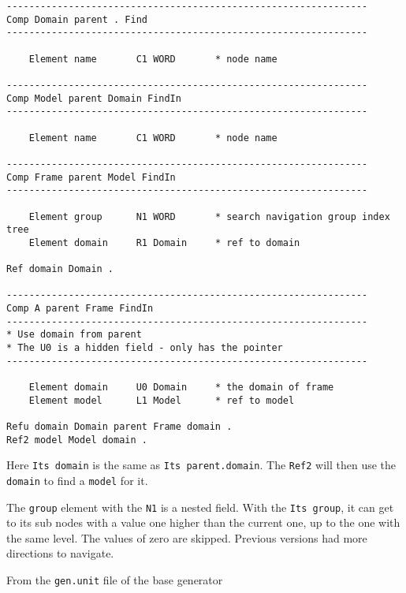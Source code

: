 \begin{verbatim}
----------------------------------------------------------------
Comp Domain parent . Find
----------------------------------------------------------------

    Element name       C1 WORD       * node name

----------------------------------------------------------------
Comp Model parent Domain FindIn
----------------------------------------------------------------

    Element name       C1 WORD       * node name

----------------------------------------------------------------
Comp Frame parent Model FindIn
----------------------------------------------------------------

    Element group      N1 WORD       * search navigation group index tree
    Element domain     R1 Domain     * ref to domain

Ref domain Domain .

----------------------------------------------------------------
Comp A parent Frame FindIn
----------------------------------------------------------------
* Use domain from parent
* The U0 is a hidden field - only has the pointer
----------------------------------------------------------------

    Element domain     U0 Domain     * the domain of frame
    Element model      L1 Model      * ref to model

Refu domain Domain parent Frame domain .
Ref2 model Model domain .
\end{verbatim}

Here \texttt{Its\ domain} is the same as \texttt{Its\ parent.domain}.
The \texttt{Ref2} will then use the \texttt{domain} to find a
\texttt{model} for it.

The \texttt{group} element with the \texttt{N1} is a nested field. With
the \texttt{Its\ group}, it can get to its sub nodes with a value one
higher than the current one, up to the one with the same level. The
values of zero are skipped. Previous versions had more directions to
navigate.

From the \texttt{gen.unit} file of the base generator

